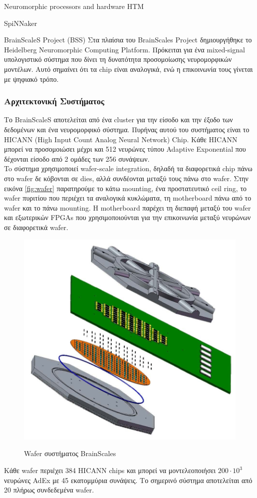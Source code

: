 \documentclass[a4paper,11pt]{article}
\begin{document}
\begin{section}{Neuromorphic processors and hardware HTM}
\begin{subsection}{SpiNNaker}
  \end{subsection}

  \begin{subsection}{BrainScaleS Project (BSS)}
    Στα πλαίσια του BrainScales Project δημιουργήθηκε το Heidelberg Neuromorphic Computing Platform. Πρόκειται για ένα mixed-signal υπολογιστικό σύστημα που δίνει τη δυνατότητα προσομοίωσης νευρομορφικών μοντέλων. Αυτό σημαίνει ότι τα chip είναι αναλογικά, ενώ η επικοινωνία τους γίνεται με ψηφιακό τρόπο.

    \subsubsection{Αρχιτεκτονική Συστήματος}

    Το BrainScaleS αποτελείται από ένα cluster για την είσοδο και την έξοδο των δεδομένων και ένα νευρομορφικό σύστημα. Πυρήνας αυτού του συστήματος είναι το HICANN (High Input Count Analog Neural Network) Chip. Κάθε HICANN μπορεί να προσομοιώσει μέχρι και 512 νευρώνες τύπου Adaptive Exponential που δέχονται είσοδο από 2 ομάδες των 256 συνάψεων.\\
    To σύστημα χρησιμοποιεί wafer-scale integration, δηλαδή τα διαφορετικά chip πάνω στο wafer δε κόβονται σε dies, αλλά συνδέονται μεταξύ τους πάνω στο wafer. Στην εικόνα \eqref{fig:wafer} παρατηρούμε το κάτω mounting, ένα προστατευτικό ceil ring, το wafer πυριτίου που περιέχει τα αναλογικά κυκλώματα, τη motherboard πάνω από το wafer και το πάνω mounting. Η motherboard παρέχει τη διεπαφή μεταξύ του wafer και εξωτερικών FPGAs που χρησιμοποιούνται για την επικοινωνία μεταξύ νευρώνων σε διαφορετικά wafer.\\
    \begin{figure}[H]
      \centering%
      {\includegraphics[width=0.3\columnwidth,clip=true]{pics/wafer.jpg}}
      \caption{Wafer συστήματος BrainScales} \label{fig:wafer}
    \end{figure}
    Κάθε wafer περιέχει 384 HICANN chips και μπορεί να μοντελεοποιήσει $200\cdot10^3$ νευρώνες AdEx με 45 εκατομμύρια συνάψεις. Το σημερινό σύστημα αποτελείται από 20 πλήρως συνδεδεμένα wafer.\\

\end{subsection}
\end{section}
\end{document}
